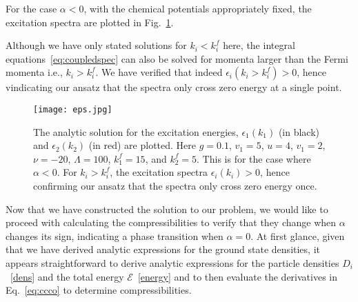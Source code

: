 \documentclass[aps,pra,
superscriptaddress,
reprint,twocolumn,preprintnumbers,
amsmath,amssymb,
nofootinbib]{revtex4-1}
\begin{document}
For the case $\alpha<0$, with the chemical potentials appropriately fixed,  the excitation spectra are plotted in Fig.~\ref{fig:06}.

Although we have only stated solutions for $k_i < k_i^f$ here, the integral equations~\eqref{eq:coupledspec} can also be solved for momenta larger than the Fermi momenta i.e., $k_i > k_i^f$. We have verified that indeed $\epsilon_i(k_i>k_i^f) >0$, hence vindicating our ansatz that the spectra only cross zero energy at a single point. 	 
\begin{figure}[t]
    \texttt{[image: eps.jpg]}
    \centering
    \caption{\label{fig:06} The analytic solution for the excitation energies, $\epsilon_{1}(k_1)$ (in black) and $\epsilon_{2}(k_2)$ (in red) are plotted. Here $g = 0.1$, $v_1 = 5$, $u = 4$, $v_1 = 2$, $\nu  = -20$, $\Lambda  = 100$, $k_1^f = 15$, and $k_2^f = 5$. This is for the case where $\alpha < 0$. For $k_i > k_i^f$, the excitation spectra $\epsilon_i(k_i) >0$, hence confirming our ansatz that the spectra only cross zero energy once.}
    \end{figure}
        


Now that we have constructed the solution to our problem, we would like to proceed with calculating the compressibilities to verify that they change when $\alpha$ changes its sign, indicating a phase transition
when $\alpha=0$. 
At first glance, given that we have derived analytic expressions for the ground state densities, it appears straightforward to derive analytic expressions for the particle densities $D_i$~\eqref{dens} and the total energy $\mathcal{E}$~\eqref{energy} and to then evaluate the derivatives in Eq.~\eqref{eq:ccco} to determine compressibilities. 
\end{document}
